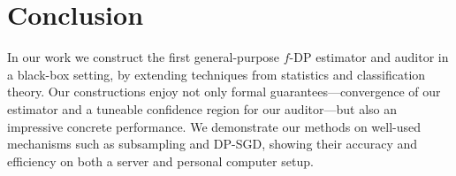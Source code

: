 
\section{Conclusion}\label{sec:summary_discussion}

In our work we construct the first general-purpose $f$-DP estimator and auditor in a black-box setting, by extending techniques from statistics and classification theory. Our constructions enjoy not only formal guarantees---convergence of our estimator and a tuneable confidence region for our auditor---but also an impressive concrete performance. We demonstrate  our methods on well-used mechanisms such as subsampling and DP-SGD, showing their accuracy and efficiency on both a server and personal computer setup.


